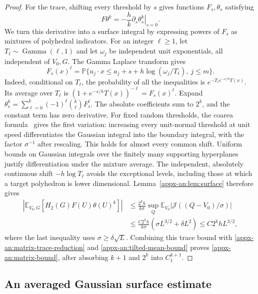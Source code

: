 \documentclass[11pt,letterpaper]{article}
\theoremstyle{remark}
\newcommand{\E}{\mathbb E}
\newcommand{\Pp}{\mathbb P}
\newcommand{\surf}{\mathcal J}
\begin{document}
\begin{proof}
For the trace, shifting every threshold by \(s\) gives functions
\(F_s,\theta_s\) satisfying
\[
 F\theta^k=-\frac hk\left.\partial_s\theta_s^k\right|_{s=0}.
\]
We turn this derivative into a surface integral by expressing powers
of \(F_s\) as mixtures of polyhedral indicators. For an integer
\(\ell\ge1\), let \(T_\ell\sim\operatorname{Gamma}(\ell,1)\) and let
\(\omega_j\) be independent unit exponentials, all independent of
\(V_0,G\). The Gamma Laplace transform gives
\begin{equation}
 F_s(x)^\ell=\Pp\{u_j\cdot x\le
        a_j+s+h\log(\omega_j/T_\ell),\ j\le m\}.
 \label{appx-an:gamma-mixture}
\end{equation}
Indeed, conditional on \(T_\ell\), the probability of all the
inequalities is \(e^{-T_\ell e^{-s/h}T(x)}\). Its average over
\(T_\ell\) is \((1+e^{-s/h}T(x))^{-\ell}=F_s(x)^\ell\).
Expand \(\theta_s^k=\sum_{\ell=0}^k(-1)^\ell\binom k\ell  F_s^\ell\).
The absolute coefficients sum to \(2^k\), and the constant term has
zero derivative. For fixed random thresholds, the coarea
formula~\cite[Section~3.4]{EvansGariepy2015} gives the first variation:
increasing every unit-normal threshold at unit speed differentiates
the Gaussian integral into the boundary integral, with the factor
\(\sigma^{-1}\) after rescaling. This holds for almost every common
shift. Uniform bounds on Gaussian integrals over the finitely many
supporting hyperplanes justify differentiation under the mixture
average. The independent, absolutely continuous shift \(-h\log T_\ell\)
avoids the exceptional levels, including those at which a target
polyhedron is lower dimensional. Lemma~\ref{appx-an:lem:surface}
therefore gives
\begin{align*}
 \left|\E_{V_0,G}[H_2(G)F(U)\theta(U)^k]\right|
 &\le\frac{2^kh}{k\sigma}
       \sup_Q\E_{V_0}|\surf((Q-V_0)/\sigma)|\\
 &\le\frac{C2^kh}{k\sigma}
       (\sigma L^{3/2}+\delta L^2)
 \le C2^khL^{3/2},
\end{align*}
where the last inequality uses \(\sigma\ge\delta\sqrt L\).
Combining this trace bound with
\eqref{appx-an:matrix-trace-reduction} and
\eqref{appx-an:tilted-mean-bound} proves
\eqref{appx-an:matrix-bound}, after absorbing \(k+1\) and \(2^k\)
into \(C_1^{k+1}\).
\end{proof}

\subsection{An averaged Gaussian surface estimate}
\label{appx-an:sec:surface}
\end{document}

